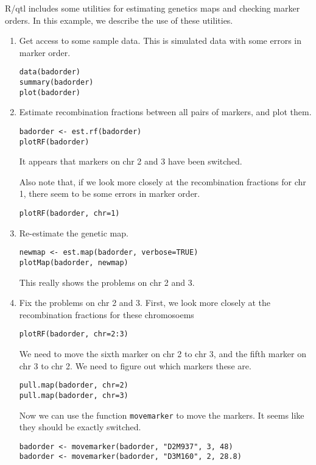 \documentclass[10pt,letterpaper]{article}
\newcommand{\usercolor}{\color [named]{BlueViolet}}
\begin{document}
\noindent R/qtl includes some utilities for estimating genetics maps
and checking marker orders.  In this example, we describe the use of
these utilities.

\begin{enumerate}

\item Get access to some sample data.  This is simulated data with
some errors in marker order.

\usercolor 
\verb|data(badorder)|  \\
\verb|summary(badorder)| \\
\verb|plot(badorder)|
\normalcolor

\item Estimate recombination fractions between all pairs of markers,
and plot them. 

\usercolor \verb|badorder <- est.rf(badorder)| \\
\verb|plotRF(badorder)| \normalcolor

It appears that markers on chr 2 and 3 have been switched.

Also note that, if we look more closely at the recombination fractions
for chr 1, there seem to be some errors in marker order.

\usercolor \verb|plotRF(badorder, chr=1)| \normalcolor

\item Re-estimate the genetic map.  

\usercolor
\verb|newmap <- est.map(badorder, verbose=TRUE)| \\
\verb|plotMap(badorder, newmap)|
\normalcolor

This really shows the problems on chr 2 and 3.

\item Fix the problems on chr 2 and 3.
First, we look more closely at the recombination fractions for these
chromosoems

\usercolor \verb|plotRF(badorder, chr=2:3)| \normalcolor

We need to move the sixth marker on chr 2 to chr 3, and
the fifth marker on chr 3 to chr 2.  We need to figure
out which markers these are.

\usercolor
\verb|pull.map(badorder, chr=2)| \\
\verb|pull.map(badorder, chr=3)| 
\normalcolor

Now we can use the function \verb-movemarker- to move the markers.
It seems like they should be exactly switched.

\usercolor \verb|badorder <- movemarker(badorder, "D2M937", 3, 48)| \\
\verb|badorder <- movemarker(badorder, "D3M160", 2, 28.8)| \normalcolor


\end{enumerate}
\end{document}
